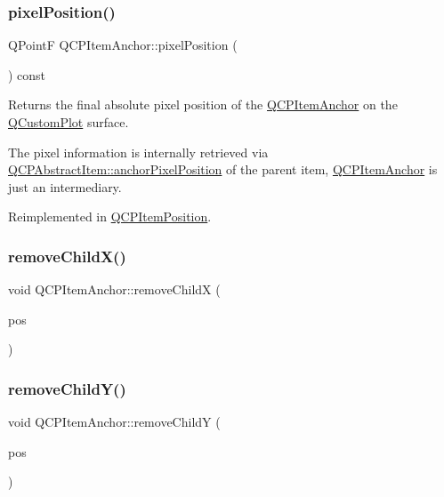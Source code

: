 \subsubsection{\texorpdfstring{pixelPosition()}{pixelPosition()}}
{\footnotesize\ttfamily Q\+PointF Q\+C\+P\+Item\+Anchor\+::pixel\+Position (\begin{DoxyParamCaption}{ }\end{DoxyParamCaption}) const\hspace{0.3cm}{\ttfamily [virtual]}}

Returns the final absolute pixel position of the \mbox{\hyperlink{class_q_c_p_item_anchor}{Q\+C\+P\+Item\+Anchor}} on the \mbox{\hyperlink{class_q_custom_plot}{Q\+Custom\+Plot}} surface.

The pixel information is internally retrieved via \mbox{\hyperlink{class_q_c_p_abstract_item_ada5bad4e1196c4fc0d0d12328e24b8f2}{Q\+C\+P\+Abstract\+Item\+::anchor\+Pixel\+Position}} of the parent item, \mbox{\hyperlink{class_q_c_p_item_anchor}{Q\+C\+P\+Item\+Anchor}} is just an intermediary. 

Reimplemented in \mbox{\hyperlink{class_q_c_p_item_position_a8be9a4787635433edecc75164beb748d}{Q\+C\+P\+Item\+Position}}.

\mbox{\label{class_q_c_p_item_anchor_a230b1d494cda63458e289bbe1b642599}} 
\subsubsection{\texorpdfstring{removeChildX()}{removeChildX()}}
{\footnotesize\ttfamily void Q\+C\+P\+Item\+Anchor\+::remove\+ChildX (\begin{DoxyParamCaption}\item[{\mbox{\hyperlink{class_q_c_p_item_position}{Q\+C\+P\+Item\+Position}} $\ast$}]{pos }\end{DoxyParamCaption})\hspace{0.3cm}{\ttfamily [protected]}}

\mbox{\label{class_q_c_p_item_anchor_aa2394911d8fff3bd958b9f4f1994b64d}} 
\subsubsection{\texorpdfstring{removeChildY()}{removeChildY()}}
{\footnotesize\ttfamily void Q\+C\+P\+Item\+Anchor\+::remove\+ChildY (\begin{DoxyParamCaption}\item[{\mbox{\hyperlink{class_q_c_p_item_position}{Q\+C\+P\+Item\+Position}} $\ast$}]{pos }\end{DoxyParamCaption})\hspace{0.3cm}{\ttfamily [protected]}}

